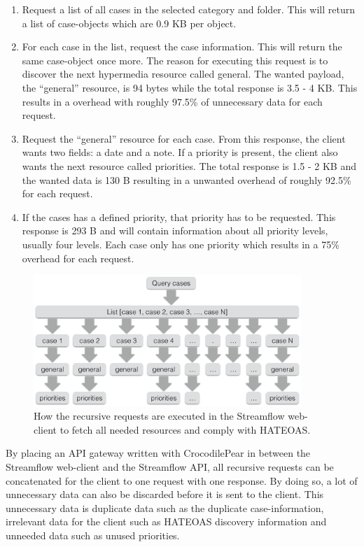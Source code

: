 \documentclass{cslthse-msc}
\begin{document}
\begin{enumerate}
	\item Request a list of all cases in the selected category and folder. This will return a list of case-objects which are 0.9 KB per object.
	\item For each case in the list, request the case information. This will return the same case-object once more. The reason for executing this request is to discover the next hypermedia resource called general. The wanted payload, the \enquote{general} resource, is 94 bytes while the total response is 3.5 - 4 KB. This results in a overhead with roughly 97.5\% of unnecessary data for each request.
	\item Request the \enquote{general} resource for each case. From this response, the client wants two fields: a date and a note. If a priority is present, the client also wants the next resource called priorities. The total response is 1.5 - 2 KB and the wanted data is 130 B resulting in a unwanted overhead of roughly 92.5\% for each request.
	\item If the cases has a defined priority, that priority has to be requested. This response is 293 B and will contain information about all priority levels, usually four levels. Each case only has one priority which results in a 75\% overhead for each request.
\end{enumerate}

\begin{figure}[H]
  \centering
    \begin{center}
      \includegraphics[width=0.9\textwidth]{images/streamflow_cases.png}
    \end{center}
  \caption{How the recursive requests are executed in the Streamflow web-client to fetch all needed resources and comply with HATEOAS.}
\end{figure}

By placing an API gateway written with CrocodilePear in between the Streamflow web-client and the Streamflow API, all recursive requests can be concatenated for the client to one request with one response. By doing so, a lot of unnecessary data can also be discarded before it is sent to the client. This unnecessary data is duplicate data such as the duplicate case-information, irrelevant data for the client such as HATEOAS discovery information and unneeded data such as unused priorities.
\end{document}
